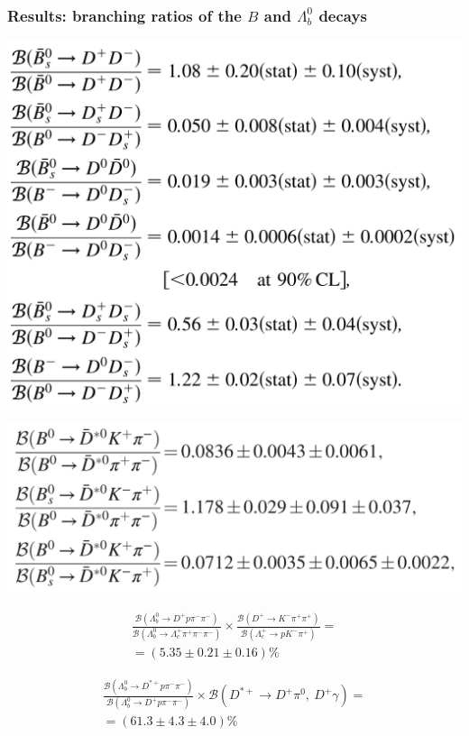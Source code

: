 \documentclass[10pt, aspectratio=169]{beamer}
\def\Lb{{\Lambda_b^0}}
\def\Lc{{\Lambda_c^+}}
\def\pip{{\pi^+}}
\def\pim{{\pi^-}}
\def\piz{{\pi^0}}
\def\Km{{K^-}}
\def\Dp{{D^+}}
\def\Dstarp{{D^{*+}}{}}
\begin{document}
\begin{frame}[label=results]%
  \frametitle{Results: branching ratios of the $B$ and $\Lb$ decays}

  \parbox{.45\linewidth}{
    \includegraphics[width=\linewidth]{figures/conf/B2DD-txt001-results}
  } \hfill \parbox{.54\linewidth}{
    \centering
    \footnotesize

    \includegraphics[width=.45\textwidth]{figures/conf/B2DKpi-txt001-results}

    $$\begin{aligned} %
    \frac{\mathcal{B}\left(\Lb\to\Dp p\pim\pim\right)}
    {\mathcal{B}\left(\Lb\to\Lc\pip\pim\pim\right)}
    \times
    \frac{\mathcal{B}\left(\Dp\to\Km\pip\pip\right)}
    {\mathcal{B}\left(\Lc\to p\Km\pip\right)}
      = \\ = (5.35\pm0.21\pm0.16)\%
    \end{aligned}$$

    $$\begin{aligned}%
    \frac{\mathcal{B}\left(\Lb\to\Dstarp p\pim\pim\right)}
    {\mathcal{B}\left(\Lb\to\Dp p\pim\pim\right)}
    \times
    \mathcal{B}\left(\Dstarp\to\Dp\piz,\ \Dp\gamma\right)
    = \\ = (61.3\pm4.3\pm4.0)\% \end{aligned}$$
  }
\end{frame}%
\end{document}
